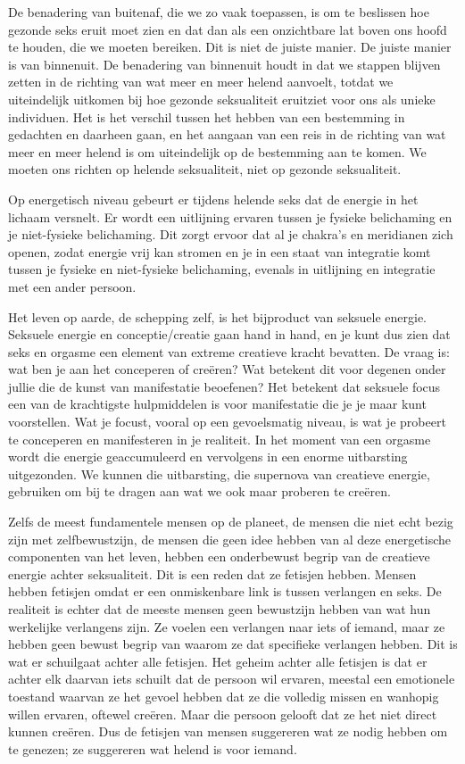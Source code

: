 De benadering van buitenaf, die we zo vaak toepassen, is om te beslissen hoe gezonde seks eruit moet zien en dat dan als een onzichtbare lat boven ons hoofd te houden, die we moeten bereiken. Dit is niet de juiste manier. De juiste manier is van binnenuit. De benadering van binnenuit houdt in dat we stappen blijven zetten in de richting van wat meer en meer helend aanvoelt, totdat we uiteindelijk uitkomen bij hoe gezonde seksualiteit eruitziet voor ons als unieke individuen. Het is het verschil tussen het hebben van een bestemming in gedachten en daarheen gaan, en het aangaan van een reis in de richting van wat meer en meer helend is om uiteindelijk op de bestemming aan te komen. We moeten ons richten op helende seksualiteit, niet op gezonde seksualiteit.

Op energetisch niveau gebeurt er tijdens helende seks dat de energie in het lichaam versnelt. Er wordt een uitlijning ervaren tussen je fysieke belichaming en je niet-fysieke belichaming. Dit zorgt ervoor dat al je chakra's en meridianen zich openen, zodat energie vrij kan stromen en je in een staat van integratie komt tussen je fysieke en niet-fysieke belichaming, evenals in uitlijning en integratie met een ander persoon.

Het leven op aarde, de schepping zelf, is het bijproduct van seksuele energie. Seksuele energie en conceptie/creatie gaan hand in hand, en je kunt dus zien dat seks en orgasme een element van extreme creatieve kracht bevatten. De vraag is: wat ben je aan het conceperen of creëren? Wat betekent dit voor degenen onder jullie die de kunst van manifestatie beoefenen? Het betekent dat seksuele focus een van de krachtigste hulpmiddelen is voor manifestatie die je je maar kunt voorstellen. Wat je focust, vooral op een gevoelsmatig niveau, is wat je probeert te conceperen en manifesteren in je realiteit. In het moment van een orgasme wordt die energie geaccumuleerd en vervolgens in een enorme uitbarsting uitgezonden. We kunnen die uitbarsting, die supernova van creatieve energie, gebruiken om bij te dragen aan wat we ook maar proberen te creëren.

Zelfs de meest fundamentele mensen op de planeet, de mensen die niet echt bezig zijn met zelfbewustzijn, de mensen die geen idee hebben van al deze energetische componenten van het leven, hebben een onderbewust begrip van de creatieve energie achter seksualiteit. Dit is een reden dat ze fetisjen hebben. Mensen hebben fetisjen omdat er een onmiskenbare link is tussen verlangen en seks. De realiteit is echter dat de meeste mensen geen bewustzijn hebben van wat hun werkelijke verlangens zijn. Ze voelen een verlangen naar iets of iemand, maar ze hebben geen bewust begrip van waarom ze dat specifieke verlangen hebben. Dit is wat er schuilgaat achter alle fetisjen. Het geheim achter alle fetisjen is dat er achter elk daarvan iets schuilt dat de persoon wil ervaren, meestal een emotionele toestand waarvan ze het gevoel hebben dat ze die volledig missen en wanhopig willen ervaren, oftewel creëren. Maar die persoon gelooft dat ze het niet direct kunnen creëren. Dus de fetisjen van mensen suggereren wat ze nodig hebben om te genezen; ze suggereren wat helend is voor iemand.

